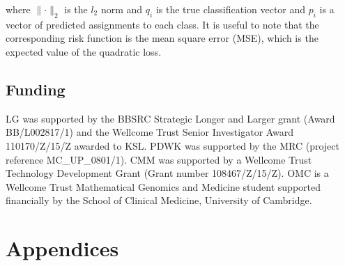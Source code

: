 \documentclass[12pt,english]{article}\usepackage[]{graphicx}\usepackage[]{color}
\begin{document}
where $\lVert\cdot\rVert_2$ is the $l_2$ norm and $q_i$ is the
true classification vector and $p_i$ is a vector of predicted
assignments to each class. It is useful to note that
the corresponding risk function is the mean square error (MSE), which
is the expected value of the quadratic loss.

\subsection*{Funding}

LG was supported by the BBSRC Strategic Longer and Larger grant (Award
BB/L002817/1) and the Wellcome Trust Senior Investigator Award
110170/Z/15/Z awarded to KSL. PDWK was supported by the MRC (project
reference MC\_UP\_0801/1). CMM was supported by a Wellcome Trust
Technology Development Grant (Grant number 108467/Z/15/Z). OMC is a
Wellcome Trust Mathematical Genomics and Medicine student supported
financially by the School of Clinical Medicine, University of Cambridge.

\clearpage
\section{Appendices}
\end{document}
